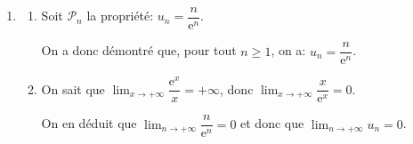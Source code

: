 \documentclass[10pt]{article}
\providecommand{\e}{{\mathrm{e}}}
\providecommand{\ds}{\displaystyle}
\begin{document}
\begin{enumerate}
\begin{enumerate}
Or pour tout $n$, $u_n>0$, donc:
$\dfrac{1}{\e} \left (1+\dfrac{1}{n}\right ) u_n\leqslant u_n$
c'est-à-dire $u_{n+1}\leqslant u_n$.

La suite $\left(u_{n}\right)$ est décroissante.
		
		\item 
Pour tout $n$, $u_n>0$ donc la suite $(u_n)$ est minorée par 0.

On a démontré que cette suite était décroissante donc, d'après le théorème de la convergence monotone, la suite $(u_n)$ est convergente.		
		\end{enumerate}

	\item \begin{enumerate}
		\item Soit $\mathcal{P}_n$ la propriété: $u_{n}=\dfrac{n}{\e^{n}}$.
		
		
On a donc démontré que, pour tout $n\geqslant 1$, on a: $u_{n}=\dfrac{n}{\e^{n}}$.

		\item 
On sait que
$\ds\lim _{x\to +\infty} \dfrac{\e^{x}}{x}=+\infty$,
donc		
$\ds\lim _{x\to +\infty} \dfrac{x}{\e^{x}}=0$.

On en déduit que
$\ds\lim _{n\to +\infty} \dfrac{n}{\e^{n}}=0$
et donc que
$\ds\lim _{n\to +\infty} u_n=0$.

	\end{enumerate}
\end{enumerate}

\bigskip
\end{document}

